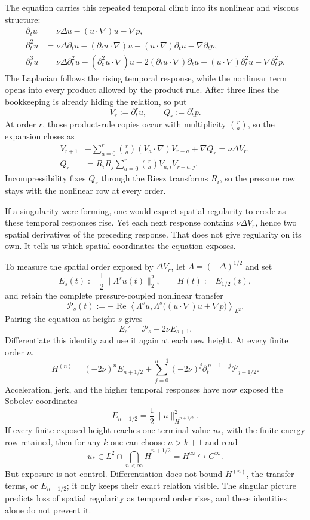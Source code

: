 The equation carries this repeated temporal climb into its nonlinear and
viscous structure:
\[
\begin{aligned}
 \partial_tu
 &=\nu\Delta u-(u\!\cdot\nabla)u-\nabla p,\\
 \partial_t^2u
 &=\nu\Delta\partial_tu
   -(\partial_tu\!\cdot\nabla)u
   -(u\!\cdot\nabla)\partial_tu
   -\nabla\partial_tp,\\
 \partial_t^3u
 &=\nu\Delta\partial_t^2u
   -(\partial_t^2u\!\cdot\nabla)u
   -2(\partial_tu\!\cdot\nabla)\partial_tu
   -(u\!\cdot\nabla)\partial_t^2u
   -\nabla\partial_t^2p.
\end{aligned}
\]
The Laplacian follows the rising temporal response, while the nonlinear term
opens into every product allowed by the product rule.  After three lines the
bookkeeping is already hiding the relation, so put
\[
 V_r:=\partial_t^ru,
 \qquad
 Q_r:=\partial_t^rp.
\]
At order \(r\), those product-rule copies occur with multiplicity
\(\binom ra\), so the expansion closes as
\[
\begin{aligned}
 V_{r+1}
 &+\sum_{a=0}^{r}\binom ra
   (V_a\!\cdot\nabla)V_{r-a}
   +\nabla Q_r
   =\nu\Delta V_r,\\
 Q_r
 &=R_iR_j\sum_{a=0}^{r}\binom ra
   V_{a,i}V_{r-a,j}.
\end{aligned}
\]
Incompressibility fixes \(Q_r\) through the Riesz transforms \(R_i\), so the
pressure row stays with the nonlinear row at every order.

If a singularity were forming, one would expect spatial regularity to erode as
these temporal responses rise.  Yet each next response contains
\(\nu\Delta V_r\), hence two spatial derivatives of the preceding response.
That does not give regularity on its own.  It tells us which spatial
coordinates the equation exposes.

To measure the spatial order exposed by \(\Delta V_r\), let
\(\Lambda=(-\Delta)^{1/2}\) and set
\[
 E_s(t):=\frac12\|\Lambda^su(t)\|_2^2,
 \qquad
 H(t):=E_{1/2}(t),
\]
and retain the complete pressure-coupled nonlinear transfer
\[
 \mathcal P_s(t)
 :=-\operatorname{Re}\left\langle
 \Lambda^su,
 \Lambda^s\bigl((u\!\cdot\nabla)u+\nabla p\bigr)
 \right\rangle_{L^2}.
\]
Pairing the equation at height \(s\) gives
\[
 E_s'=\mathcal P_s-2\nu E_{s+1}.
\]
Differentiate this identity and use it again at each new height.  At every
finite order \(n\),
\[
 H^{(n)}
 =(-2\nu)^nE_{n+1/2}
 +\sum_{j=0}^{n-1}(-2\nu)^j
   \partial_t^{\,n-1-j}\mathcal P_{j+1/2}.
\]
Acceleration, jerk, and the higher temporal responses have now exposed the
Sobolev coordinates
\[
 E_{n+1/2}
 =\frac12\|u\|_{\dot H^{n+1/2}}^2.
\]
If every finite exposed height reaches one terminal value \(u_*\), with the
finite-energy row retained, then for any \(k\) one can choose \(n>k+1\) and
read
\[
 u_*\in L^2\cap\bigcap_{n<\infty}\dot H^{n+1/2}
 =H^\infty
 \hookrightarrow C^\infty.
\]
But exposure is not control.  Differentiation does not bound
\(H^{(n)}\), the transfer terms, or \(E_{n+1/2}\); it only keeps their exact
relation visible.  The singular picture predicts loss of spatial regularity
as temporal order rises, and these identities alone do not prevent it.

